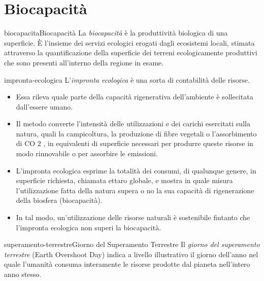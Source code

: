 \documentclass[preview]{standalone}
\begin{document}
\genpage

\section{Biocapacità}

\begin{snippetdefinition}{biocapacita}{Biocapacità}
    La \textit{biocapacità} è la produttività biologica di una superficie. È
    l'insieme dei servizi ecologici erogati dagli ecosistemi locali, stimata
    attraverso la quantificazione della superficie dei terreni
    ecologicamente produttivi che sono presenti all'interno della regione
    in esame.
\end{snippetdefinition}


\begin{snippet}{impronta-ecologica}
    L'\textit{impronta ecologica} è una sorta di contabilità delle risorse.
    \begin{itemize}
        \item Essa rileva quale parte della capacità rigenerativa
            dell'ambiente è sollecitata dall'essere umano.
        \item Il metodo converte l'intensità delle utilizzazioni e dei
            carichi esercitati sulla natura, quali la campicoltura, la
            produzione di fibre vegetali o l'assorbimento di CO 2 , in
            equivalenti di superficie necessari per produrre queste
            risorse in modo rinnovabile o per assorbire le emissioni.
        \item L'impronta ecologica esprime la totalità dei consumi, di qualunque
            genere, in superficie richiesta, chiamata ettaro globale, e mostra
            in quale misura l'utilizzazione fatta della natura supera o no la sua
            capacità di rigenerazione della biosfera (biocapacità). 
        \item In tal modo, un'utilizzazione delle risorse naturali è sostenibile
            fintanto che l'impronta ecologica non superi la biocapacità.
    \end{itemize}
\end{snippet}

\begin{snippetdefinition}{superamento-terrestre}{Giorno del Superamento Terrestre}
    Il \textit{giorno del superamento terrestre} (Earth Overshoot Day)
    indica a livello illustrativo il giorno dell'anno nel quale l'umanità
    consuma interamente le risorse prodotte dal pianeta nell'intero anno stesso. 
\end{snippetdefinition}

\end{document}
